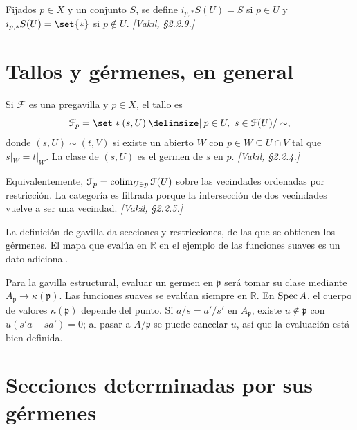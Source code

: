 \begin{ejem}
\label{ejem:s04-gavilla-rascacielos}
Fijados $p\in X$ y un conjunto $S$, se define $i_{p,*}S(U)=S$ si $p\in U$ y $i_{p,*}S(U)=\set{*}$ si $p\notin U$. \emph{[Vakil, \S2.2.9.]}
\end{ejem}

\section{Tallos y gérmenes, en general}

\begin{defi}[Tallo]
\label{defi:s04-tallo}
Si $\mathcal F$ es una pregavilla y $p\in X$, el tallo es
\[
\mathcal F_p=\set*{(s,U) \given p\in U,\ s\in\mathcal F(U)}/\sim,
\]
donde $(s,U)\sim(t,V)$ si existe un abierto $W$ con $p\in W\subseteq U\cap V$ tal que $s|_W=t|_W$. La clase de $(s,U)$ es el germen de $s$ en $p$. \emph{[Vakil, \S2.2.4.]}
\end{defi}

\begin{obs}
\label{obs:s04-definicion-colimite}
Equivalentemente, $\mathcal F_p=\operatorname*{colim}_{U\ni p}\mathcal F(U)$ sobre las vecindades ordenadas por restricción. La categoría es filtrada porque la intersección de dos vecindades vuelve a ser una vecindad. \emph{[Vakil, \S2.2.5.]}
\end{obs}

\begin{nota}[Advertencia]
La definición de gavilla da secciones y restricciones, de las que se obtienen los gérmenes. El mapa que evalúa en $\mathbb R$ en el ejemplo de las funciones suaves es un dato adicional.
\end{nota}

\begin{obs}
\label{obs:s04-evaluacion-tallo-gavilla-estructural}
Para la gavilla estructural, evaluar un germen en $\mathfrak p$ será tomar su clase mediante $A_{\mathfrak p}\to\kappa(\mathfrak p)$. Las funciones suaves se evalúan siempre en $\mathbb R$. En $\operatorname{Spec} A$, el cuerpo de valores $\kappa(\mathfrak p)$ depende del punto. Si $a/s=a'/s'$ en $A_{\mathfrak p}$, existe $u\notin\mathfrak p$ con $u(s'a-sa')=0$; al pasar a $A/\mathfrak p$ se puede cancelar $u$, así que la evaluación está bien definida.
\end{obs}

\section{Secciones determinadas por sus gérmenes}

